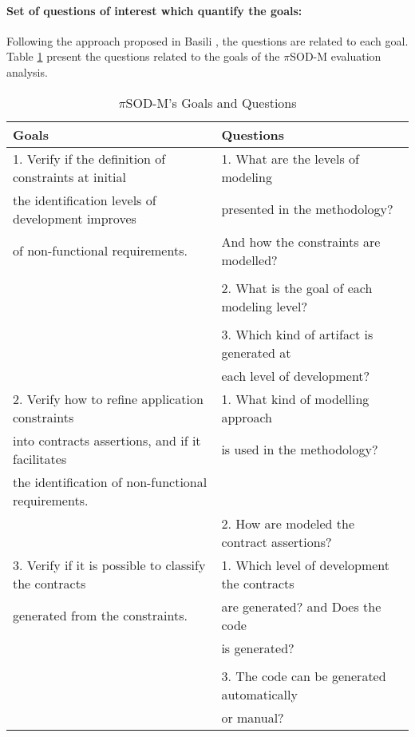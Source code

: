 \documentclass[runningheads,a4paper]{llncs}
\begin{document}
\paragraph{Set of questions of interest which quantify the goals:} Following the
approach proposed in Basili \cite{basili:1985}, the questions are related to each goal. Table \ref{tab7:questions} present the questions related to the goals of the $\pi$SOD-M evaluation analysis.

\begin{table}
\centering
\caption{$\pi$SOD-M's Goals and Questions}
\label{tab7:questions}

\begin{tabular}{|l|l|}

\hline 
\hline \textbf{Goals} & \textbf{Questions} \\

\hline 1. Verify if the definition of constraints at initial& 1. What are the
levels of modeling  \\ 

 the identification levels of development improves  & presented in the
methodology?  \\

   of non-functional requirements. &    And how the
  constraints are modelled?  \\
 
 &  \\
 
 &  2. What is the goal of each modeling level?\\

&  \\
 
 &  3. Which kind of artifact is generated at\\
 & each level of development?\\
\hline
2. Verify how to refine application constraints & 1. What kind of modelling
approach\\

 into contracts assertions, and if it facilitates &  is used in the
 methodology?
 \\
 
the identification of non-functional requirements. & \\

& 2. How are modeled the contract assertions?\\


\hline

3. Verify if it is possible to classify the contracts  &1. Which level of
development the contracts \\ 
generated from the constraints. &  are
generated? and Does the code\\ 
&is generated?\\
&\\
& 3. The code can be generated automatically \\
& or manual?\\


\end{tabular}
\end{table}
\end{document}
